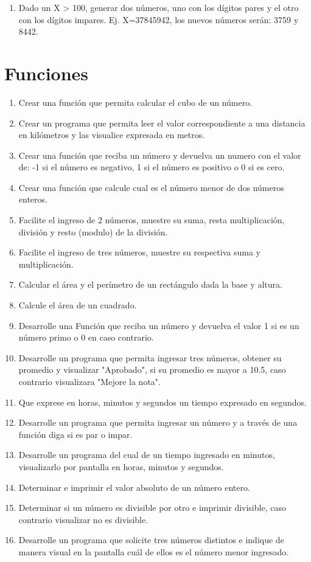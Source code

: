 \documentclass{scrartcl}
\begin{document}
\begin{enumerate}
		\item Dado un X > 100, generar dos números, uno con los dígitos pares y el otro con los dígitos impares. Ej. X=37845942, los nuevos números serán: 3759 y 8442.
	\end{enumerate}

	\section{Funciones}
	
	\begin{enumerate}
		\item Crear una función que permita calcular el cubo de un número.
		\item Crear un programa que permita leer el valor correspondiente a una distancia en kilómetros y las visualice expresada en metros.
		\item Crear una función que reciba un número y devuelva un numero con el valor de: -1 si el número es negativo, 1 si el número es positivo o 0 si es cero.
		\item Crear una función que calcule cual es el número menor de dos números enteros.
		\item Facilite el ingreso de 2 números, muestre su suma, resta multiplicación, división y resto (modulo) de la división.
		\item Facilite el ingreso de tres números, muestre su respectiva suma y		multiplicación.
		\item Calcular el área y el perímetro de un rectángulo dada la base y altura.
		
		\item Calcule el área de un cuadrado.
		\item Desarrolle una Función que reciba un número y devuelva el valor 1 si		es un número primo o 0 en caso contrario.
		
		\item Desarrolle un programa que permita ingresar tres números, obtener su promedio y visualizar "Aprobado", si su promedio es mayor a 10.5, caso contrario visualizara "Mejore la nota".
		\item Que exprese en horas, minutos y segundos un tiempo expresado en segundos.
		\item Desarrolle un programa que permita ingresar un número y a través de una función diga si es par o impar.
		\item Desarrolle un programa del cual de un tiempo ingresado en minutos, visualizarlo por pantalla en horas, minutos y segundos.
		\item Determinar e imprimir el valor absoluto de un número entero.
		\item Determinar si un número es divisible por otro e imprimir divisible, caso contrario visualizar no es divisible.
		\item Desarrolle un programa que solicite tres números distintos e indique		de manera visual en la pantalla cuál de ellos es el número menor ingresado.
	\end{enumerate}
\end{document}

